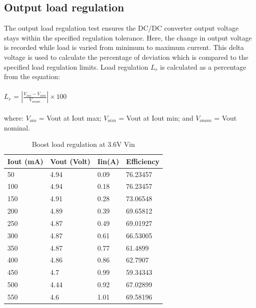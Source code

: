 \subsection{Output load regulation} 
The output load regulation test ensures the DC/DC converter output voltage stays within the specified regulation tolerance. Here, the change in output voltage is recorded while load is varied from minimum to maximum current. This delta voltage is used to calculate the percentage of deviation which is compared to the specified load regulation limits. Load regulation $L_{r}$ is calculated as a percentage from the equation:
\\ \\
\hspace*{5cm}$L_{r}$ = $\left | \frac{V_{oio}-V_{oim}}{V_{onom}} \right | \times 100$
\\ \\
where:
$V_{oio}$ = Vout at Iout max; 
$V_{oim}$ = Vout at Iout min; and
$V_{onom}$ = Vout nominal.
\\
\begin{table}[H]
\centering
\begin{tabular}{|l|l|l|l|}
\hline
Iout (mA) & Vout (Volt) & Iin(A) & Efficiency \\ \hline
50        & 4.94        & 0.09   & 76.23457   \\ \hline
100       & 4.94        & 0.18   & 76.23457   \\ \hline
150       & 4.91        & 0.28   & 73.06548   \\ \hline
200       & 4.89        & 0.39   & 69.65812   \\ \hline
250       & 4.87        & 0.49   & 69.01927   \\ \hline
300       & 4.87        & 0.61   & 66.53005   \\ \hline
350       & 4.87        & 0.77   & 61.4899    \\ \hline
400       & 4.86        & 0.86   & 62.7907    \\ \hline
450       & 4.7         & 0.99   & 59.34343   \\ \hline
500       & 4.44        & 0.92   & 67.02899   \\ \hline
550       & 4.6         & 1.01   & 69.58196   \\ \hline
\end{tabular}
\caption{Boost load regulation at 3.6V Vin}
\label{table:4}
\end{table}
\\

